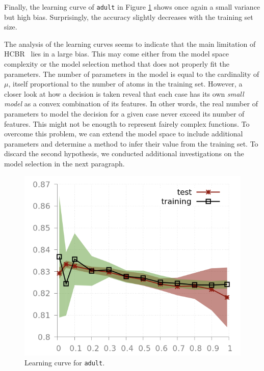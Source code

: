 \documentclass[preprint,12pt]{elsarticle}
\def\HCBR{{\sc HCBR}}
\theoremstyle{definition}
\begin{document}
Finally, the learning curve of \texttt{adult} in Figure \ref{fig:learning_curve_1} shows once again a small variance but high bias. Surprisingly, the accuracy slightly decreases with the training set size.

The analysis of the learning curves seems to indicate that the main limitation of \HCBR~ lies in a large bias. This may come either from the model space complexity or the model selection method that does not properly fit the parameters. The number of parameters in the model is equal to the cardinality of $\mu$, itself proportional to the number of atoms in the training set. However, a closer look at how a decision is taken reveal that each case has its own {\it small model} as a convex combination of its features. In other words, the real number of parameters to model the decision for a given case never exceed its number of features. This might not be enougth to represent fairely complex functions. To overcome this problem, we can extend the model space to include additional parameters and determine a method to infer their value from the training set. To discard the second hypothesis, we conducted additional investigations on the model selection in the next paragraph.


\begin{figure}[!h]\centering
\includegraphics[scale=0.3]{img/learning_curve_adult.png}
\caption{Learning curve for \texttt{adult}.}
\label{fig:learning_curve_1}
\end{figure}
\end{document}
